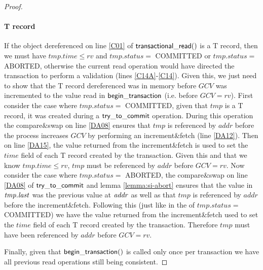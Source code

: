 \begin{proof}
\paragraph{T record} If the object dereferenced on line \ref{C01} of $\sf{transactional\_read}()$ is a T record, then we must have $\mathit{tmp.time} \leq \mathit{rv}$ and 
$\mathit{tmp.status} = $ COMMITTED or $\mathit{tmp.status} = $ ABORTED, otherwise the current read operation would have directed the transaction
to perform a validation (lines \ref{C14A}-\ref{C14}).
Given this, we just need to show that the T record dereferenced was in memory before $\mathit{GCV}$ was incremented to the value
read in $\sf{begin\_transaction}$ (i.e. before $\mathit{GCV} = \mathit{rv}$).
First consider the case where $\mathit{tmp.status} = $ COMMITTED, given that $\mathit{tmp}$ is a T record, it was created
during a $\sf{try\_to\_commit}$ operation.
During this operation  the compare\&swap on line \ref{DA08} ensures  that $\mathit{tmp}$ is referenced by $\mathit{addr}$ before the process
increases $\mathit{GCV}$ by performing an increment\&fetch (line \ref{DA12}).
Then on line \ref{DA15}, the value returned from the increment\&fetch is used to set the $\mathit{time}$ field of each T record
created by the transaction.
Given this and that we know $\mathit{tmp.time} \leq \mathit{rv}$, $\mathit{tmp}$ must be referenced by $\mathit{addr}$ before
$\mathit{GCV} = \mathit{rv}$.
Now consider the case where $\mathit{tmp.status} = $ ABORTED, the compare\&swap on line \ref{DA08} of $\sf{try\_to\_commit}$ and lemma \ref{lemma:si-abort} ensures
that the value in $\ms{tmp.last}$ was the previous value at $\ms{addr}$ as well as that $\mathit{tmp}$ is referenced by $\mathit{addr}$
before the increment\&fetch.
Following this (just like in the of $\mathit{tmp.status} = $ COMMITTED) we have the value returned from the increment\&fetch
used to set the $\mathit{time}$ field of each T record created by the transaction.
Therefore $\mathit{tmp}$ must have been referenced by $\mathit{addr}$ before $\mathit{GCV} = \mathit{rv}$.

Finally, given that $\sf{begin\_transaction}()$ is called only once per transaction
we have all previous read operations still being consistent.
\end{proof}




